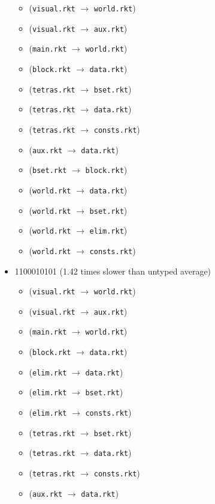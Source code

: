 \documentclass{article}
\newcommand{\mono}[1]{\texttt{#1}}
\begin{document}
\begin{itemize}
  \begin{itemize}
  \item (\mono{visual.rkt} $\rightarrow$ \mono{world.rkt})
  \item (\mono{visual.rkt} $\rightarrow$ \mono{aux.rkt})
  \item (\mono{main.rkt} $\rightarrow$ \mono{world.rkt})
  \item (\mono{block.rkt} $\rightarrow$ \mono{data.rkt})
  \item (\mono{tetras.rkt} $\rightarrow$ \mono{bset.rkt})
  \item (\mono{tetras.rkt} $\rightarrow$ \mono{data.rkt})
  \item (\mono{tetras.rkt} $\rightarrow$ \mono{consts.rkt})
  \item (\mono{aux.rkt} $\rightarrow$ \mono{data.rkt})
  \item (\mono{bset.rkt} $\rightarrow$ \mono{block.rkt})
  \item (\mono{world.rkt} $\rightarrow$ \mono{data.rkt})
  \item (\mono{world.rkt} $\rightarrow$ \mono{bset.rkt})
  \item (\mono{world.rkt} $\rightarrow$ \mono{elim.rkt})
  \item (\mono{world.rkt} $\rightarrow$ \mono{consts.rkt})
  \end{itemize}
\item 1100010101 (1.42 times slower than untyped average)
  \begin{itemize}
  \item (\mono{visual.rkt} $\rightarrow$ \mono{world.rkt})
  \item (\mono{visual.rkt} $\rightarrow$ \mono{aux.rkt})
  \item (\mono{main.rkt} $\rightarrow$ \mono{world.rkt})
  \item (\mono{block.rkt} $\rightarrow$ \mono{data.rkt})
  \item (\mono{elim.rkt} $\rightarrow$ \mono{data.rkt})
  \item (\mono{elim.rkt} $\rightarrow$ \mono{bset.rkt})
  \item (\mono{elim.rkt} $\rightarrow$ \mono{consts.rkt})
  \item (\mono{tetras.rkt} $\rightarrow$ \mono{bset.rkt})
  \item (\mono{tetras.rkt} $\rightarrow$ \mono{data.rkt})
  \item (\mono{tetras.rkt} $\rightarrow$ \mono{consts.rkt})
  \item (\mono{aux.rkt} $\rightarrow$ \mono{data.rkt})

\end{itemize}
\end{itemize}
\end{document}
